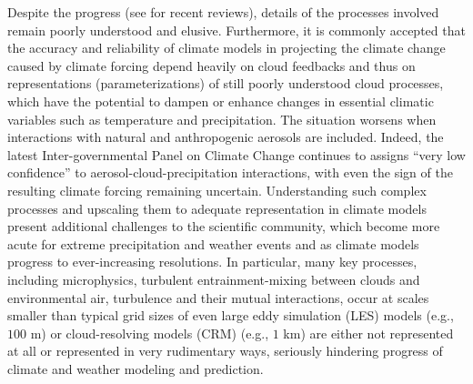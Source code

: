 Despite the progress (see \cite{Devenish2012, GrabowskiWang2013} for recent reviews), details of the processes involved remain poorly understood and elusive. Furthermore, it is commonly accepted that the accuracy and reliability of climate models in projecting the climate change caused by climate forcing depend heavily on cloud feedbacks and thus on representations (parameterizations) of still poorly understood cloud processes, which have the potential to dampen or enhance changes in essential climatic variables such as temperature and precipitation. The situation worsens when interactions with natural and anthropogenic aerosols are included. Indeed, the latest Inter-governmental Panel on Climate Change continues to assigns ``very low confidence'' to aerosol-cloud-precipitation interactions, with even the sign of the resulting climate forcing remaining uncertain. Understanding such complex processes and upscaling them to adequate representation in climate models present additional challenges to the scientific community, which become more acute for extreme precipitation and weather events and as climate models progress to ever-increasing resolutions. In particular, many key processes, including microphysics, turbulent entrainment-mixing between clouds and environmental air, turbulence and their mutual interactions, occur at scales smaller than typical grid sizes of even large eddy simulation (LES) models (e.g., $100$ m) or cloud-resolving models (CRM) (e.g., $1$ km) are either not represented at all or represented in very rudimentary ways, seriously hindering progress of climate and weather modeling and prediction.

